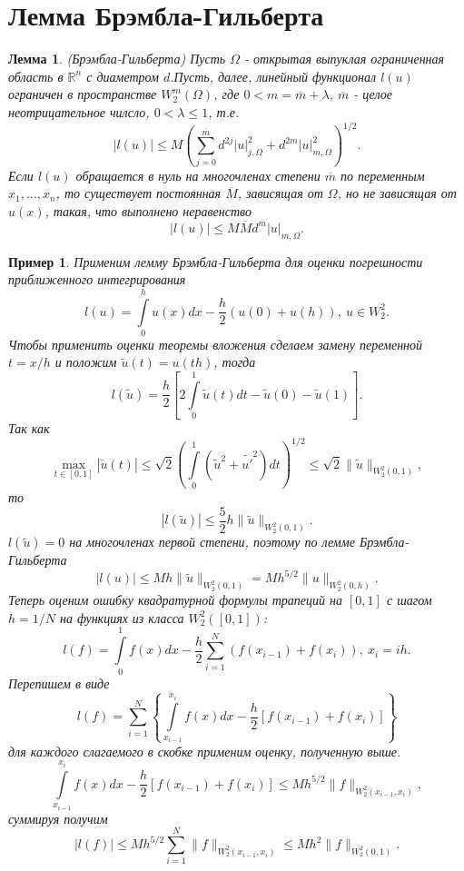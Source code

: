 \documentclass[9pt]{article}
\newtheorem{lemma}{Лемма} %
\newtheorem{example}{Пример} %
\begin{document}
	\section{Лемма Брэмбла-Гильберта}
	\begin{lemma} (Брэмбла-Гильберта)\newline
		Пусть $\Omega$ - открытая выпуклая ограниченная область в $\mathbb{R}^n$ с диаметром $d$.Пусть, далее, линейный функционал $l(u)$ ограничен в пространстве $W^m_2(\Omega)$, где $0 < m = \overline{m} + \lambda$, $\overline{m}$ - целое неотрицательное чилсло, $0 < \lambda  \leq 1$, т.е.
		\begin{equation*}
			|l(u)| \leq M\left(\sum\limits_{j=0}^{\overline{m}} d^{2j}|u|^2_{j,\Omega} + d^{2m}|u|^2_{m,\Omega}\right)^{1/2}.
		\end{equation*}
		Если $l(u)$ обращается в нуль на многочленах степени $\overline{m}$ по переменным $x_1, \dots, x_n$, то существует постоянная $\overline{M}$, зависящая от $\Omega$, но не зависящая от $u(x)$, такая, что выполнено неравенство
		$$
		|l(u)| \leq M \overline{M} d^m |u|_{m,\Omega}.
		$$
	\end{lemma}
\begin{example}

	Применим лемму Брэмбла-Гильберта для оценки погрешности приближенного интегрирования
	$$
		l(u) = \int\limits_0^h u(x) dx - \dfrac{h}{2} (u(0) + u(h)), \ u \in W^2_2.
	$$
	Чтобы применить оценки теоремы вложения сделаем замену переменной $ t = x/h$ и положим $\tilde{u}(t) = u(th)$, тогда
	$$
		l(\tilde{u}) = \dfrac{h}2 \left[2 \int\limits_0^1 \tilde{u}(t) dt - \tilde{u}(0) - \tilde{u}(1)\right].
	$$
	Так как
	$$
		\max\limits_{t \in [0,1]} |\tilde{u}(t)| \leq \sqrt{2} \left(\int\limits_0^1 \left(\tilde{u}^2  + \tilde{u'}^2\right) dt\right)^{1/2} \leq \sqrt2 \|\tilde{u}\|_{W^2_2(0,1)},
	$$
	то
	$$
	|l(\tilde{u})| \leq \dfrac52 h \|\tilde{u}\|_{W^2_2(0,1)}.
	$$
	$l(\tilde{u}) = 0$  на многочленах первой степени, поэтому по лемме Брэмбла-Гильберта 
	$$
		|l(u)| \leq Mh\|\tilde{u}\|_{W^2_2(0,1)} = Mh^{5/2}\|u\|_{W^2_2(0,h)}.
	$$
	Теперь оценим ошибку квадратурной формулы трапеций на $[0,1]$ с шагом $h = 1/N$ на функциях из класса $W^2_2([0,1])$:
	$$
		l(f) = \int\limits_0^1 f(x)dx - \dfrac{h}{2} \sum\limits_{i=1}^{N}(f(x_{i-1}) + f(x_i)), \ x_i = ih.
	$$
	Перепишем в виде
	$$
		l(f) = \sum\limits_{i=1}^{N} \left\{\int\limits_{x_{i-1}}^{x_i} f(x)dx - \dfrac{h}{2} \left[f(x_{i-1}) + f(x_i)\right] \right\}
	$$
	для каждого слагаемого в скобке применим оценку, полученную выше.
	$$
	\int\limits_{x_{i-1}}^{x_i} f(x)dx - \dfrac{h}{2} \left[f(x_{i-1}) + f(x_i)\right] \leq M h^{5/2} \|f\|_{W^2_2(x_{i-1}, x_i)},
	$$
	суммируя получим
	$$
	|l(f)| \leq Mh^{5/2} \sum\limits_{i=1}^N \|f\|_{W^2_2 (x_{i-1}, x_i)} \leq Mh^2\|f\|_{W^2_2(0,1)}.
	$$
\end{example}
\end{document}
